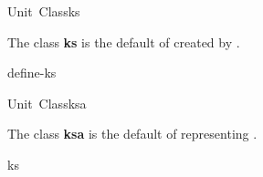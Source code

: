 \documentclass[10pt,twoside,english,pdftex]{article}
\begin{document}

\begin{functiondoc}{Unit~Class}{ks}{}
%
%

\fnsyntax

\fnpackage {}

\fnmodule {}

\fndescription 
{}%
The class \textbf{ks} is the default  of
 created by \textbf{}.

\begin{alsos}{define-ks}
\also[define-ks]
\also[ksa]
\end{alsos}

\end{functiondoc}


\begin{functiondoc}{Unit~Class}{ksa}{}
%
%

\fnsyntax

\fnpackage {}

\fnmodule {}

\fndescription 
The class \textbf{ksa} is the default  of
 representing .

\begin{alsos}{ks}
\also[ks]
\end{alsos}

\end{functiondoc}

\end{document}

